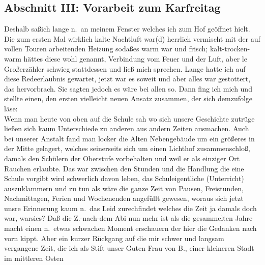 \documentclass[
]{article}
\author{}
\date{\vspace{-2.5em}}
\begin{document}
\subsection{Abschnitt III: Vorarbeit zum
Karfreitag}\label{abschnitt-iii-vorarbeit-zum-karfreitag}

Deshalb saßich lange n.~an meinem Fenster welches ich zum Hof geöffnet
hielt. Die zum ersten Mal wirklich kalte Nachtluft war(d) herrlich
vermischt mit der auf vollen Touren arbeitenden Heizung sodaßes warm war
und frisch; kalt-trocken-warm hättes diese wohl genannt, Verbindung vom
Feuer und der Luft, aber le Großerzähler schwieg stattdessen und ließ
mich sprechen. Lange hatte ich auf diese Redeerlaubnis gewartet, jetzt
war es soweit und aber alles war gestottert, das hervorbrach. Sie sagten
jedoch es wäre bei allen so. Dann fing ich mich und stellte einen, den
ersten vielleicht neuen Ansatz zusammen, der sich demzufolge läse:\\
Wenn man heute von oben auf die Schule sah wo sich unsere Geschichte
zutrüge ließen sich kaum Unterschiede zu anderen aus andern Zeiten
ausmachen. Auch bei unserer Anstalt fand man locker die Alten
Nebengebäude um ein größeres in der Mitte gelagert, welches seinerseits
sich um einen Lichthof zusammenschloß, damals den Schülern der Oberstufe
vorbehalten und weil er als einziger Ort Rauchen erlaubte. Das war
zwischen den Stunden und die Handlung die eine Schule vorgibt wird
schwerlich davon leben, das Schuleigentliche (Unterricht) auszuklammern
und zu tun als wäre die ganze Zeit von Pausen, Freistunden,
Nachmittagen, Ferien und Wochenenden angefüllt gewesen, woraus sich
jetzt unsre Erinnerung kaum n.~das Leid zurechfindet welches die Zeit ja
damals doch war, warsies? Daß die Z.-nach-dem-Abi nun mehr ist als die
gesammelten Jahre macht einen n.~etwas schwachen Moment erschauern der
hier die Gedanken nach vorn kippt. Aber ein kurzer Rückgang auf die mir
schwer und langsam vergangene Zeit, die ich als Stift unser Guten Frau
von B., einer kleineren Stadt im mittleren Osten
\end{document}
